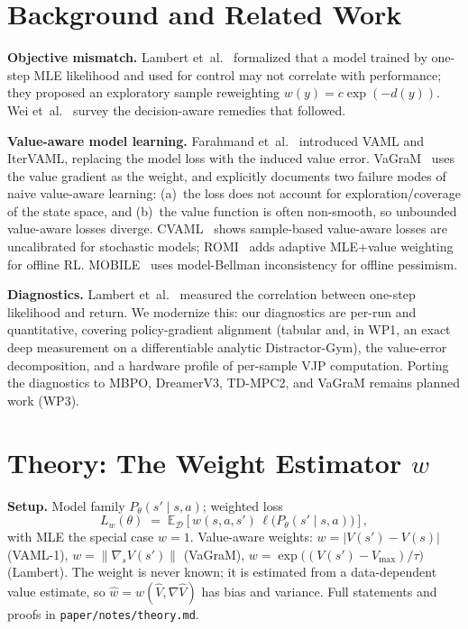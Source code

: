 \documentclass[11pt]{article}
\begin{document}
\section{Background and Related Work}

\textbf{Objective mismatch.} Lambert et~al.~\cite{lambert2020objective} formalized that a
model trained by one-step MLE likelihood and used for control may not correlate with
performance; they proposed an exploratory sample reweighting $w(y) = c \exp(-d(y))$.
Wei et~al.~\cite{wei2024unified} survey the decision-aware remedies that followed.

\textbf{Value-aware model learning.} Farahmand et~al.~\cite{farahmand2017vaml,farahmand2018itervaml}
introduced VAML and IterVAML, replacing the model loss with the induced value error.
VaGraM~\cite{voelcker2022vagram} uses the value gradient as the weight, and explicitly
documents two failure modes of naive value-aware learning: (a)~the loss does not account
for exploration/coverage of the state space, and (b)~the value function is often
non-smooth, so unbounded value-aware losses diverge. CVAML~\cite{cvaml2025} shows
sample-based value-aware losses are uncalibrated for stochastic models; ROMI~\cite{romi2026}
adds adaptive MLE+value weighting for offline RL. MOBILE~\cite{sun2023mobile} uses
model-Bellman inconsistency for offline pessimism.

\textbf{Diagnostics.} Lambert et~al.~\cite{lambert2020objective} measured the correlation
between one-step likelihood and return. We modernize this: our diagnostics are per-run
and quantitative, covering policy-gradient alignment (tabular and, in WP1, an exact
deep measurement on a differentiable analytic Distractor-Gym), the value-error
decomposition, and a hardware profile of per-sample VJP computation. Porting the
diagnostics to MBPO, DreamerV3, TD-MPC2, and VaGraM remains planned work (WP3).

\section{Theory: The Weight Estimator \texorpdfstring{$w$}{w}}
\label{sec:theory}

\textbf{Setup.} Model family $P_\theta(s' \mid s, a)$; weighted loss
\begin{equation}
  L_w(\theta) \;=\; \mathbb{E}_{\mathcal{D}}\!\left[
    w(s, a, s')\, \ell\bigl(P_\theta(s' \mid s, a)\bigr)
  \right],
  \label{eq:weighted-loss}
\end{equation}
with MLE the special case $w = 1$. Value-aware weights: $w = \lvert V(s') - V(s)\rvert$
(VAML-1), $w = \lVert \nabla_s V(s')\rVert$ (VaGraM),
$w = \exp\bigl((V(s') - V_{\max})/\tau\bigr)$ (Lambert). The weight is never known; it
is estimated from a data-dependent value estimate, so
$\hat{w} = w(\hat{V}, \nabla \hat{V})$ has bias and variance. Full statements and proofs
in \texttt{paper/notes/theory.md}.
\end{document}
